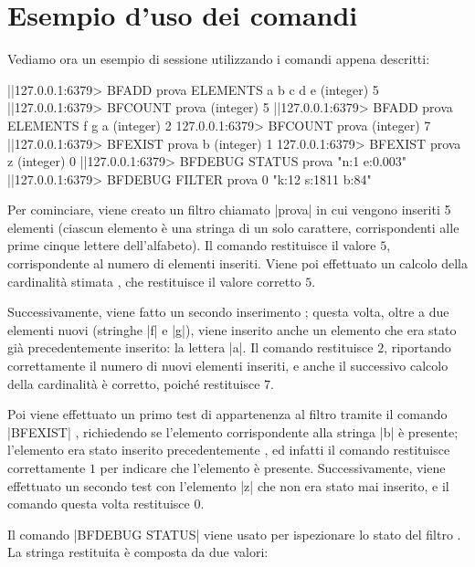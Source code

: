 \section{Esempio d'uso dei comandi}

Vediamo ora un esempio di sessione utilizzando i comandi appena descritti:

\medskip
\begin{commentedsource}[style=redis,caption=Esempio di utilizzo dei nuovi comandi per i filtri di Bloom]
|\lnote|127.0.0.1:6379> BFADD prova ELEMENTS a b c d e
(integer) 5
|\lnote|127.0.0.1:6379> BFCOUNT prova
(integer) 5
|\lnote|127.0.0.1:6379> BFADD prova ELEMENTS f g a
(integer) 2
127.0.0.1:6379> BFCOUNT prova
(integer) 7
|\lnote|127.0.0.1:6379> BFEXIST prova b
(integer) 1
127.0.0.1:6379> BFEXIST prova z
(integer) 0
|\lnote|127.0.0.1:6379> BFDEBUG STATUS prova
"n:1 e:0.003"
|\lnote|127.0.0.1:6379> BFDEBUG FILTER prova 0
"k:12 s:1811 b:84"
\end{commentedsource}

Per cominciare, viene creato un filtro chiamato \cverb|prova|  in cui vengono inseriti 5
elementi (ciascun elemento è una stringa di un solo carattere, corrispondenti alle prime cinque
lettere dell'alfabeto). Il comando restituisce il valore $5$, corrispondente al numero di elementi
inseriti. Viene poi effettuato un calcolo della cardinalità stimata , che
restituisce il valore corretto $5$.

Successivamente, viene fatto un secondo inserimento ; questa volta, oltre a due
elementi nuovi (stringhe \cverb|f| e \cverb|g|), viene inserito anche un elemento che era stato
già precedentemente inserito: la lettera \cverb|a|. Il comando restituisce $2$, riportando
correttamente il numero di nuovi elementi inseriti, e anche il successivo calcolo della
cardinalità è corretto, poiché restituisce $7$.

Poi viene effettuato un primo test di appartenenza al filtro tramite il comando \cverb|BFEXIST|
, richiedendo se l'elemento corrispondente alla stringa \cverb|b| è presente; l'elemento era
stato inserito precedentemente , ed infatti il comando restituisce correttamente $1$ per
indicare che l'elemento è presente. Successivamente, viene effettuato un secondo test con l'elemento
\cverb|z| che non era stato mai inserito, e il comando questa volta restituisce $0$.

Il comando \cverb|BFDEBUG STATUS| viene usato per ispezionare lo
stato del filtro . La stringa restituita è composta da due valori:

